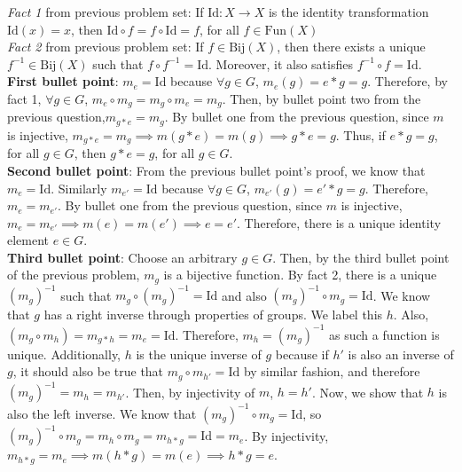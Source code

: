 \documentclass{amsart}
\begin{document}
\begin{enumerate}[itemsep=0.4in]
\emph{Fact 1} from previous problem set: If $\mathrm{Id}:X\to X$ is the identity transformation $\mathrm{Id}(x) = x$, then $\mathrm{Id}\circ f = f\circ \mathrm{Id} = f$, for all $f\in \mathrm{Fun}(X)$\\

\emph{Fact 2} from previous problem set: If $f\in \mathrm{Bij}(X)$, then there exists a unique $f^{-1}\in \mathrm{Bij}(X)$ such that $f\circ f^{-1} = \mathrm{Id}$. Moreover, it also satisfies $f^{-1}\circ f=\mathrm{Id}$.\\

\textbf{First bullet point}: $m_e=\mathrm{Id}$ because $\forall g\in G$, $m_e(g)=e*g=g$. Therefore, by fact 1, $\forall g\in G$, $m_e\circ m_g=m_g\circ m_e=m_g$. Then, by bullet point two from the previous question,$m_{g*e}=m_g$. By bullet one from the previous question, since $m$ is injective, $m_{g*e}=m_g\implies m(g*e)=m(g)\implies g*e=g$. Thus, if $e*g = g$, for all $g\in G$, then $g*e = g$, for all $g\in G$.\\

\textbf{Second bullet point}: From the previous bullet point's proof, we know that $m_e=\mathrm{Id}$. Similarly $m_{e'}=\mathrm{Id}$ because $\forall g\in G$, $m_{e'}(g)={e'}*g=g$. Therefore, $m_e=m_{e'}$. By bullet one from the previous question, since $m$ is injective, $m_e=m_{e'}\implies m(e)=m(e')\implies e=e'$. Therefore, there is a unique identity element $e\in G$.\\

\textbf{Third bullet point}: Choose an arbitrary $g\in G$. Then, by the third bullet point of the previous problem, $m_g$ is a bijective function. By fact 2, there is a unique $(m_g)^{-1}$ such that $m_g\circ(m_g)^{-1}=\mathrm{Id}$ and also $(m_g)^{-1}\circ m_g=\mathrm{Id}$. We know that $g$ has a right inverse through properties of groups. We label this $h$. Also, $(m_g\circ m_h)=m_{g*h}=m_e=\mathrm{Id}$. Therefore, $m_h=(m_g)^{-1}$ as such a function is unique. Additionally, $h$ is the unique inverse of $g$ because if $h'$ is also an inverse of $g$, it should also be true that $m_g\circ m_{h'}=\mathrm{Id}$ by similar fashion, and therefore $(m_g)^{-1}=m_h=m_{h'}$. Then, by injectivity of $m$, $h=h'$. Now, we show that $h$ is also the left inverse. We know that $(m_g)^{-1}\circ m_g=\mathrm{Id}$, so  $(m_g)^{-1}\circ m_g=m_h\circ m_g=m_{h*g}=\mathrm{Id}=m_e$. By injectivity, $m_{h*g}=m_e\implies m(h*g)=m(e)\implies h*g=e$. 


\end{enumerate}
\end{document}
